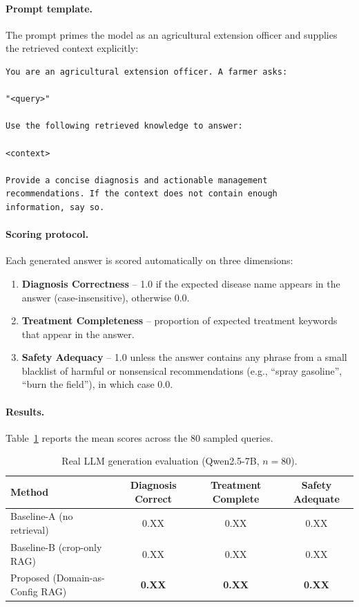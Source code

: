 \paragraph{Prompt template.} The prompt primes the model as an agricultural extension officer and supplies the retrieved context explicitly:

\begin{verbatim}
You are an agricultural extension officer. A farmer asks:

"<query>"

Use the following retrieved knowledge to answer:

<context>

Provide a concise diagnosis and actionable management
recommendations. If the context does not contain enough
information, say so.
\end{verbatim}

\paragraph{Scoring protocol.} Each generated answer is scored automatically on three dimensions:
\begin{enumerate}[label=\textbf{S\arabic*:},leftmargin=*]
    \item \textbf{Diagnosis Correctness} -- 1.0 if the expected disease name appears in the answer (case-insensitive), otherwise 0.0.
    \item \textbf{Treatment Completeness} -- proportion of expected treatment keywords that appear in the answer.
    \item \textbf{Safety Adequacy} -- 1.0 unless the answer contains any phrase from a small blacklist of harmful or nonsensical recommendations (e.g., ``spray gasoline'', ``burn the field''), in which case 0.0.
\end{enumerate}

\paragraph{Results.} Table~\ref{tab:llm_eval_results} reports the mean scores across the 80 sampled queries.

\begin{table}[htbp]
\centering
\caption{Real LLM generation evaluation (Qwen2.5-7B, $n=80$).}
\label{tab:llm_eval_results}
\begin{tabular}{lccc}
\hline
\textbf{Method} & \textbf{Diagnosis Correct} & \textbf{Treatment Complete} & \textbf{Safety Adequate} \\
\hline
Baseline-A (no retrieval)        & 0.XX  & 0.XX  & 0.XX \\
Baseline-B (crop-only RAG)       & 0.XX  & 0.XX  & 0.XX \\
Proposed (Domain-as-Config RAG)  & \textbf{0.XX}  & \textbf{0.XX}  & \textbf{0.XX} \\
\hline
\end{tabular}
\end{table}

